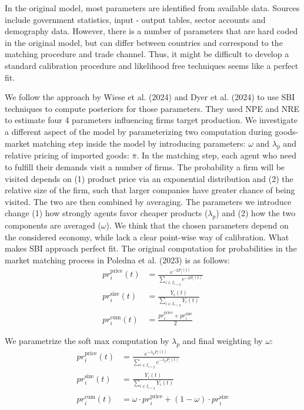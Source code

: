 \documentclass[12pt]{article}
\begin{document}
In the original model, most parameters are identified from available data. Sources include government statistics, input - output tables, sector accounts and demography data. However, there is a number of parameters that are hard coded in the original model, but can differ between countries and correspond to the matching procedure and trade channel. Thus, it might be difficult to develop a standard calibration procedure and likelihood free techniques seems like a perfect fit. 

We follow the approach by Wiese et al. (2024) and Dyer et al. (2024) to use SBI techniques to compute posteriors for those parameters. They used NPE and NRE to estimate four 4 parameters influencing firms target production. We investigate a different aspect of the model by parameterizing two computation during goods-market matching step inside the model by introducing parameters: $\omega$ and $\lambda_p$ and relative pricing of imported goods: $\bar{\pi}$. In the matching step, each agent who need to fulfill their demands visit a number of firms. The probability a firm will be visited depends on (1) product price via an exponential distribution and (2) the relative size of the firm, such that larger companies have greater chance of being visited. The two are then combined by averaging. The parameters we introduce change (1) how strongly agents favor cheaper products ($\lambda_p$) and (2) how the two components are averaged ($\omega$). We think that the chosen parameters depend on the considered economy, while lack a clear point-wise way of calibration. What makes SBI approach perfect fit. The original computation for probabilities in the market matching process in Poledna et al. (2023) is as follows:
\begin{align*}
    pr_i^{\text{price}}(t) &= \frac{e^{-2P_i(t)}}{\sum_{i \in I_{s = g}}e^{-2P_i(t)}} \\
    pr_i^{\text{size}}(t) &= \frac{Y_i(t)}{\sum_{i \in I_{s = g}}Y_i(t)} \\
    pr_i^{\text{cum}}(t) &= \frac{pr_i^\text{price} + pr_i^\text{size}}{2}
\end{align*}

We parametrize the soft max computation by $\lambda_p$ and final weighting by $\omega$:
\begin{align*} 
    pr_i^{\text{price}}(t) &= \frac{e^{- \lambda_p P_i(t)}}{\sum_{i \in I_{s = g}}e^{-\lambda_p P_i(t)}} \\
    pr_i^{\text{size}}(t) &= \frac{Y_i(t)}{\sum_{i \in I_{s = g}}Y_i(t)} \\
    pr_i^{\text{cum}}(t) &= \omega \cdot  pr_i^\text{price} + (1 - \omega) \cdot pr_i^\text{size}
\end{align*}
\end{document}
